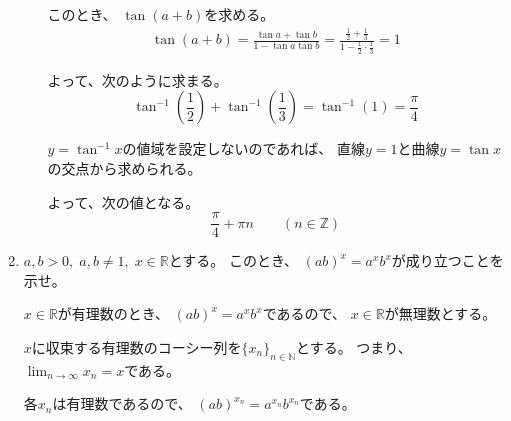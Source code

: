 \documentclass[12pt,b5paper]{ltjsarticle}
\begin{document}
\begin{enumerate}
\begin{enumerate}
            このとき、
            $\tan(a+b)$を求める。
            \begin{align}
             \tan(a+b)
             =
             \frac{\tan{a}+\tan{b}}{1-\tan{a}\tan{b}}
             =
             \frac{\frac{1}{2}+\frac{1}{3}}{1-\frac{1}{2}\cdot\frac{1}{3}}
             =
             1
            \end{align}

            よって、次のように求まる。
            \begin{equation}
             \tan^{-1}{\left(\frac{1}{2}\right)} + \tan^{-1}{\left(\frac{1}{3}\right)}
              = \tan^{-1}{(1)}
              = \frac{\pi}{4}
            \end{equation}

            $y=\tan^{-1}{x}$の値域を設定しないのであれば、
            直線$y=1$と曲線$y=\tan{x}$の交点から求められる。


            よって、次の値となる。
            \begin{equation}
             \frac{\pi}{4} + \pi n \qquad (n \in \mathbb{Z})
            \end{equation}

            \hrulefill

      \end{enumerate}

      \hrulefill
 \item
      $a,b >0,\; a,b\ne 1,\; x\in\mathbb{R}$とする。
      このとき、
      $(ab)^{x}=a^{x}b^{x}$が成り立つことを示せ。

      \dotfill

      $x\in\mathbb{R}$が有理数のとき、
      $(ab)^{x}=a^{x}b^{x}$であるので、
      $x\in\mathbb{R}$が無理数とする。

      $x$に収束する有理数のコーシー列を$\{x_{n}\}_{n\in\mathbb{N}}$とする。
      つまり、$\displaystyle \lim_{n\to\infty}x_{n}=x$である。

      各$x_{n}$は有理数であるので、
      $(ab)^{x_{n}}=a^{x_{n}}b^{x_{n}}$である。


\end{enumerate}
\end{document}
